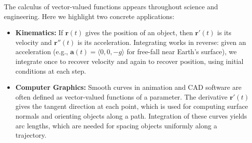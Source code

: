 \noindent The calculus of vector-valued functions appears throughout science and engineering. Here we highlight two concrete applications:

\begin{itemize}
    \item \textbf{Kinematics:} If \( \mathbf{r}(t) \) gives the position of an object, then \( \mathbf{r}'(t) \) is its velocity and \( \mathbf{r}''(t) \) is its acceleration. Integrating works in reverse: given an acceleration (e.g., \( \mathbf{a}(t) = \langle 0, 0, -g \rangle \) for free-fall near Earth's surface), we integrate once to recover velocity and again to recover position, using initial conditions at each step.

    \item \textbf{Computer Graphics:} Smooth curves in animation and CAD software are often defined as vector-valued functions of a parameter. The derivative \( \mathbf{r}'(t) \) gives the tangent direction at each point, which is used for computing surface normals and orienting objects along a path. Integration of these curves yields arc lengths, which are needed for spacing objects uniformly along a trajectory.
\end{itemize}




